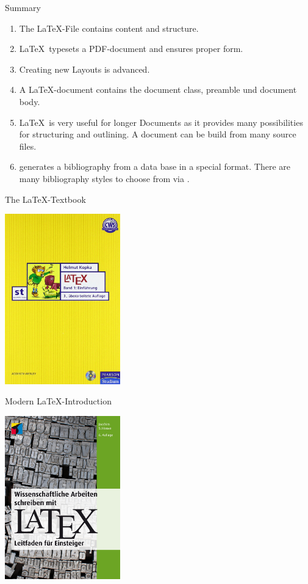 
\begin{frame}[fragile]{Summary}
  \begin{enumerate}
    \item The \alert{\LaTeX-File} contains \alert{content and structure}.
    \item \LaTeX\ typesets a \alert{PDF-document} and ensures proper \alert{form}.
    \item Creating {new Layouts} is advanced.
    \item A \LaTeX-document contains the \alert{document class}, \alert{preamble} und \alert{document body}.
    \item \LaTeX\ is very useful for \alert{longer Documents} as it provides many possibilities for \alert{structuring} and
      \alert{outlining}. A document can be build from
      \alert{many source files}.
    \item \alert{\BibTeX} generates a \alert{bibliography} from a \alert{data base} in a special format. There are many \alert{bibliography styles} to choose from via \lstinline--.
  \end{enumerate}
\end{frame}

\begin{frame}{The \LaTeX-Textbook}
  \begin{center}
    \includegraphics[width=5cm]{buecher/kopka}
  \end{center}
\end{frame}

\begin{frame}{Modern \LaTeX-Introduction}
  \begin{center}
    \includegraphics[width=5cm]{buecher/schlosser}
  \end{center}
\end{frame}

